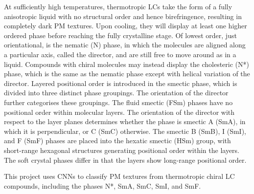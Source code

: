 \documentclass[12pt]{article}
\begin{document}
At sufficiently high temperatures, thermotropic LCs take the form of a fully anisotropic liquid with no structural order and hence birefringence, resulting in completely dark PM textures. Upon cooling, they will display at least one higher ordered phase before reaching the fully crystalline stage. Of lowest order, just orientational, is the nematic (N) phase, in which the molecules are aligned along a particular axis, called the director, and are still free to move around as in a liquid. Compounds with chiral molecules may instead display the cholesteric (N*) phase, which is the same as the nematic phase except with helical variation of the director. Layered positional order is introduced in the smectic phase, which is divided into three distinct phase groupings. The orientation of the director further categorises these groupings. The fluid smectic (FSm) phases have no positional order within molecular layers. The orientation of the director with respect to the layer planes determines whether the phase is smectic A (SmA), in which it is perpendicular, or C (SmC) otherwise. The smectic B (SmB), I (SmI), and F (SmF) phases are placed into the hexatic smectic (HSm) group, with short-range hexagonal structures generating positional order within the layers. The soft crystal phases differ in that the layers show long-range positional order.

This project uses CNNs to classify PM textures from thermotropic chiral LC compounds, including the phases N*, SmA, SmC, SmI, and SmF.  
\end{document}
